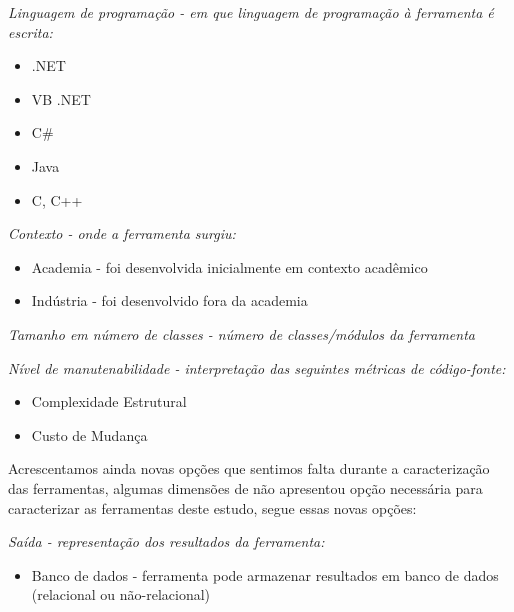 \begin{description}

  \item {\it Linguagem de programação - em que linguagem de programação à ferramenta é escrita:}
    \begin{itemize}
      \item .NET
      \item VB .NET
      \item C\#
      \item Java
      \item C, C++
    \end{itemize}

  \item {\it Contexto - onde a ferramenta surgiu:}
    \begin{itemize}
      \item Academia - foi desenvolvida inicialmente em contexto acadêmico
      \item Indústria - foi desenvolvido fora da academia
    \end{itemize}

  \item {\it Tamanho em número de classes - número de classes/módulos da ferramenta}

  \item {\it Nível de manutenabilidade - interpretação das seguintes métricas de código-fonte:}
    \begin{itemize}
      \item Complexidade Estrutural
      \item Custo de Mudança
    \end{itemize}

\end{description}

Acrescentamos ainda novas opções que sentimos falta durante a caracterização das
ferramentas, algumas dimensões de \cite{Novak2010} não apresentou opção necessária
para caracterizar as ferramentas deste estudo, segue essas novas opções:

\begin{description}

  \item {\it Saída - representação dos resultados da ferramenta:}
    \begin{itemize}
      \item Banco de dados - ferramenta pode armazenar resultados em banco de dados (relacional ou não-relacional)
    \end{itemize}

\end{description}

